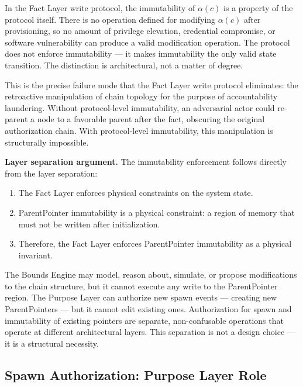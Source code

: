 In the Fact Layer write protocol, the immutability of $\alpha(c)$ is a property of the protocol itself. There is no operation defined for modifying $\alpha(c)$ after provisioning, so no amount of privilege elevation, credential compromise, or software vulnerability can produce a valid modification operation. The protocol does not enforce immutability — it makes immutability the only valid state transition. The distinction is architectural, not a matter of degree.

This is the precise failure mode that the Fact Layer write protocol eliminates: the retroactive manipulation of chain topology for the purpose of accountability laundering. Without protocol-level immutability, an adversarial actor could re-parent a node to a favorable parent after the fact, obscuring the original authorization chain. With protocol-level immutability, this manipulation is structurally impossible.

\medskip
\noindent\textbf{Layer separation argument.} The immutability enforcement follows directly from the \bxthree{} layer separation:

\begin{enumerate}
    \item[(L1)] The Fact Layer enforces physical constraints on the system state.
    \item[(L2)] ParentPointer immutability is a physical constraint: a region of memory that must not be written after initialization.
    \item[(L3)] Therefore, the Fact Layer enforces ParentPointer immutability as a physical invariant.
\end{enumerate}

The Bounds Engine may model, reason about, simulate, or propose modifications to the chain structure, but it cannot execute any write to the ParentPointer region. The Purpose Layer can authorize new spawn events — creating new ParentPointers — but it cannot edit existing ones. Authorization for spawn and immutability of existing pointers are separate, non-confusable operations that operate at different architectural layers. This separation is not a design choice — it is a structural necessity.

\subsection{Spawn Authorization: Purpose Layer Role}
\label{sec:purpose-layer-spawn-authorization}

